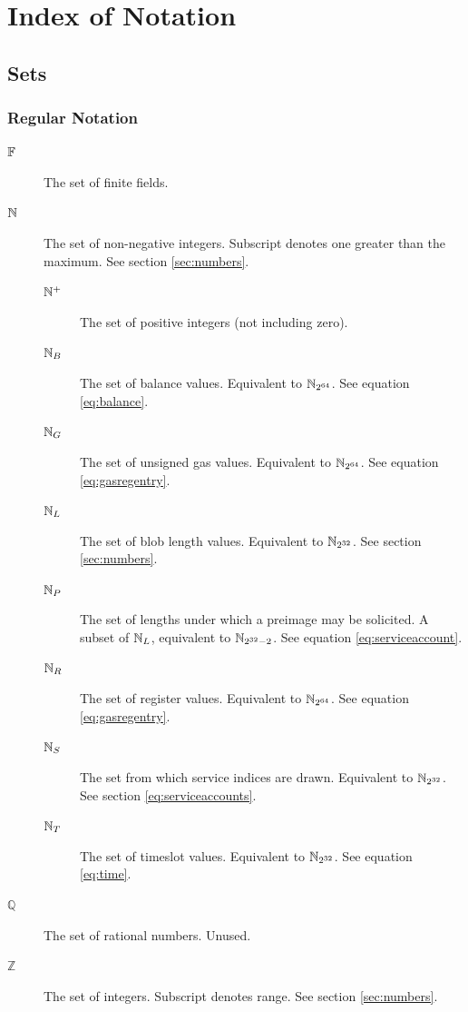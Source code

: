 \section{Index of Notation}\label{sec:definitions}

\subsection{Sets}

\subsubsection{Regular Notation}
\begin{description}
  \item[$\mathbb{F}$] The set of finite fields.
  \item[$\mathbb{N}$] The set of non-negative integers. Subscript denotes one greater than the maximum. See section \ref{sec:numbers}.
  \begin{description}
    \item[$\mathbb{N}^+$] The set of positive integers (not including zero).
    \item[$\mathbb{N}_B$] The set of balance values. Equivalent to $\mathbb{N}_{2^{64}}$. See equation \ref{eq:balance}.
    \item[$\mathbb{N}_G$] The set of unsigned gas values. Equivalent to $\mathbb{N}_{2^{64}}$. See equation \ref{eq:gasregentry}.
    \item[$\mathbb{N}_L$] The set of blob length values. Equivalent to $\mathbb{N}_{2^{32}}$. See section \ref{sec:numbers}.
    \item[$\mathbb{N}_P$] The set of lengths under which a preimage may be solicited. A subset of $\mathbb{N}_L$, equivalent to $\mathbb{N}_{2^{32} - 2}$. See equation \ref{eq:serviceaccount}.
    \item[$\mathbb{N}_R$] The set of register values. Equivalent to $\mathbb{N}_{2^{64}}$. See equation \ref{eq:gasregentry}.
    \item[$\mathbb{N}_S$] The set from which service indices are drawn. Equivalent to $\mathbb{N}_{2^{32}}$. See section \ref{eq:serviceaccounts}.
    \item[$\mathbb{N}_T$] The set of timeslot values. Equivalent to $\mathbb{N}_{2^{32}}$. See equation \ref{eq:time}.
  \end{description}
  \item[$\mathbb{Q}$] The set of rational numbers. Unused.
  \item[$\mathbb{Z}$] The set of integers. Subscript denotes range. See section \ref{sec:numbers}.
\end{description}

